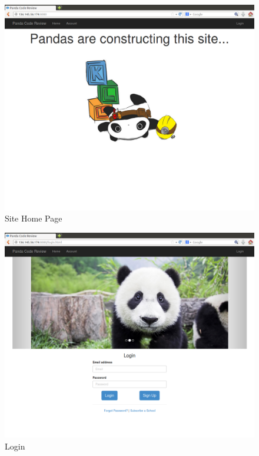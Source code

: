 \label{sec:mockups}
\begin{figure}[H]
	\centering
	\includegraphics[width=\textwidth]{img/index}
	\caption{Site Home Page}
\end{figure}

\begin{figure}[H]
	\centering
	\includegraphics[width=\textwidth]{img/login}
	\caption{Login}
\end{figure}

